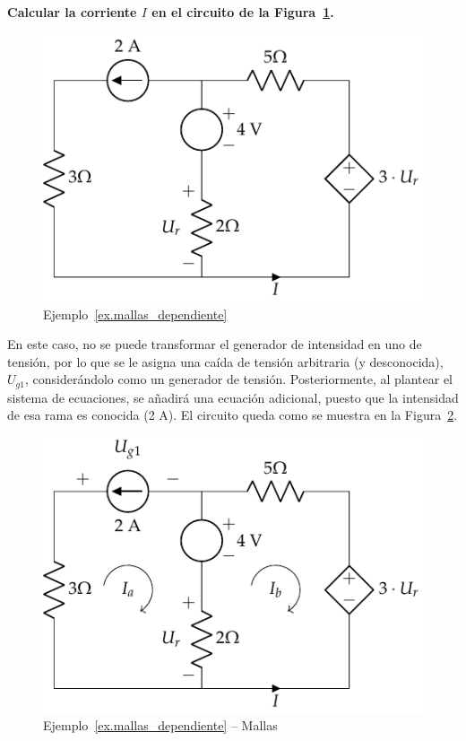 \begin{example}\label{ex.mallas_dependiente}
  \textbf{Calcular la corriente $I$ en el circuito de la
    Figura~\ref{fig:ejemplo_mallas_dependiente}.}
  \begin{figure}[H]
    \centering
    \includegraphics[width=0.35\linewidth]{../figs/ejemplo_mallas_dependiente.pdf}
    \caption{Ejemplo~\ref{ex.mallas_dependiente}}
    \label{fig:ejemplo_mallas_dependiente}
  \end{figure}
	    
  En este caso, no se puede transformar el generador de intensidad en
  uno de tensión, por lo que se le asigna una caída de tensión
  arbitraria (y desconocida), $U_{g1}$, considerándolo como un
  generador de tensión. Posteriormente, al plantear el sistema de
  ecuaciones, se añadirá una ecuación adicional, puesto que la
  intensidad de esa rama es conocida (2 A). El circuito queda como se
  muestra en la Figura~\ref{fig:mallas_dpendiente_sol}.
  \begin{figure}[H]
    \centering
    \includegraphics[width=0.35\linewidth]{../figs/ejemplo_mallas_dependiente_sol.pdf}
    \caption{Ejemplo~\ref{ex.mallas_dependiente} -- Mallas}
    \label{fig:mallas_dpendiente_sol}
  \end{figure}
	    

\end{example}
